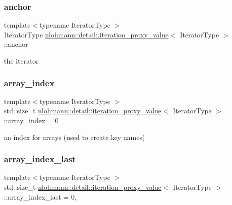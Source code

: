 \subsubsection{\texorpdfstring{anchor}{anchor}}
{\footnotesize\ttfamily template$<$typename Iterator\+Type $>$ \\
Iterator\+Type \hyperlink{classnlohmann_1_1detail_1_1iteration__proxy__value}{nlohmann\+::detail\+::iteration\+\_\+proxy\+\_\+value}$<$ Iterator\+Type $>$\+::anchor\hspace{0.3cm}{\ttfamily [private]}}



the iterator 

\mbox{\label{classnlohmann_1_1detail_1_1iteration__proxy__value_ad3d18c83aff5e9f4bdbf99385b29a39a}} 
\subsubsection{\texorpdfstring{array\+\_\+index}{array\_index}}
{\footnotesize\ttfamily template$<$typename Iterator\+Type $>$ \\
std\+::size\+\_\+t \hyperlink{classnlohmann_1_1detail_1_1iteration__proxy__value}{nlohmann\+::detail\+::iteration\+\_\+proxy\+\_\+value}$<$ Iterator\+Type $>$\+::array\+\_\+index = 0\hspace{0.3cm}{\ttfamily [private]}}



an index for arrays (used to create key names) 

\mbox{\label{classnlohmann_1_1detail_1_1iteration__proxy__value_aac6e7cc0c17242a0a42c14d1e714747c}} 
\subsubsection{\texorpdfstring{array\+\_\+index\+\_\+last}{array\_index\_last}}
{\footnotesize\ttfamily template$<$typename Iterator\+Type $>$ \\
std\+::size\+\_\+t \hyperlink{classnlohmann_1_1detail_1_1iteration__proxy__value}{nlohmann\+::detail\+::iteration\+\_\+proxy\+\_\+value}$<$ Iterator\+Type $>$\+::array\+\_\+index\+\_\+last = 0\hspace{0.3cm}{\ttfamily [mutable]}, {\ttfamily [private]}}



